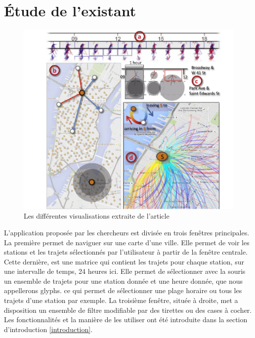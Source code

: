 \documentclass[12pt]{article}
\begin{document}
	\section{Étude de l’existant}	
	\begin{figure}[!h]
	\begin{center}
	\includegraphics[scale=.3]{screenshot_article.png}
	\caption{Les différentes visualisations extraite de l'article \cite{Oli16}}
	\end{center}
	\end{figure}
	
	L’application proposée par les chercheurs est divisée en trois fenêtres principales.
	La première permet de naviguer sur une carte d’une ville. Elle permet de voir les
	stations et les trajets sélectionnés par l’utilisateur à partir de la fenêtre centrale.
	Cette dernière, est une matrice qui contient les trajets pour chaque station, sur une
	intervalle de temps, 24 heures ici. Elle permet de sélectionner avec la souris un
	ensemble de trajets pour une station donnée et une heure donnée, que nous appellerons glyphs.
	ce qui permet de sélectionner une plage horaire ou tous les trajets d'une station par exemple.
	La troisième fenêtre, située à droite, met a disposition un ensemble de filtre modifiable
	par des tirettes ou des cases à cocher. \\
	
	Les fonctionnalités et la manière de les utiliser ont été introduite dans la section
	d'introduction \ref{introduction}.\\
\end{document}
